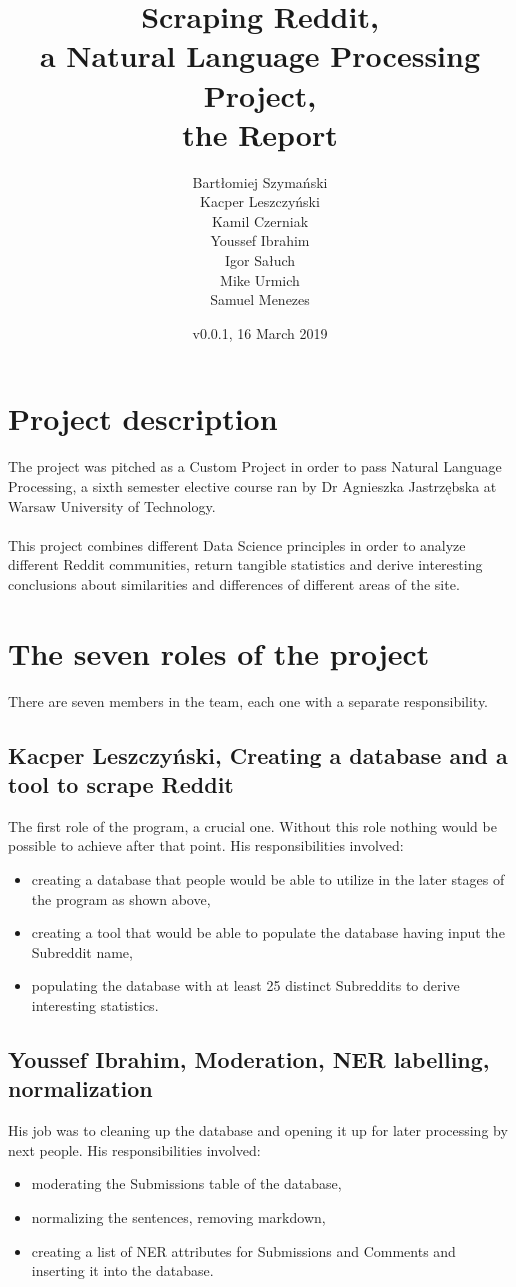 \documentclass{article}
\title{Scraping Reddit, \\a Natural Language Processing Project,\\ the Report}
\author{Bartłomiej Szymański\\
Kacper Leszczyński\\
Kamil Czerniak\\
Youssef Ibrahim\\
Igor Sałuch\\
Mike Urmich\\
Samuel Menezes}
\date{v0.0.1, 16 March 2019}
\begin{document}
\maketitle

\tableofcontents

\section{Project description}

The project was pitched as a Custom Project in order to pass Natural Language Processing, a sixth semester elective course ran by Dr Agnieszka Jastrzębska at Warsaw University of Technology. \\ \\
This project combines different Data Science principles in order to analyze different Reddit communities, return tangible statistics and derive interesting conclusions about similarities and differences of different areas of the site.


\section{The seven roles of the project}
There are seven members in the team, each one with a separate responsibility.
\subsection{Kacper Leszczyński, Creating a database and a tool to scrape Reddit}
The first role of the program, a crucial one. Without this role nothing would be possible to achieve after that point. His responsibilities involved:
\begin{itemize}
	\item creating a database that people would be able to utilize in the later stages of the program as shown above,
	\item creating a tool that would be able to populate the database having input the Subreddit name,
	\item populating the database with at least 25 distinct Subreddits to derive interesting statistics.
\end{itemize}
\subsection{Youssef Ibrahim, Moderation, NER labelling, normalization}
His job was to cleaning up the database and opening it up for later processing by next people. His responsibilities involved:
\begin{itemize}
	\item moderating the Submissions table of the database,
	\item normalizing the sentences, removing markdown,
	\item creating a list of NER attributes for Submissions and Comments and inserting it into the database.
\end{itemize}
\end{document}
